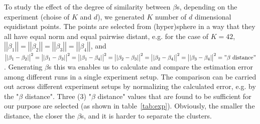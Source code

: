 \documentclass[12pt]{article}
\begin{document}
To study the effect of the degree of similarity between $\beta$s, depending on the experiment (choise of $K$ and $d$), we generated $K$ number of $d$ dimensional equidistant points. The points are selected from (hyper)sphere in a way that they all have equal norm and equal pairwise distant, e.g. for the case of $K=42$, $\left| \left| \beta _{1}\right| \right|= \left| \left|\beta _{2}\right| \right|= \left| \left|\beta _{3}\right| \right| = \left| \left|\beta _{4}\right| \right|$, and $\left| \left| \beta _{1}-\beta _{2}\right| \right| ^{2}= \left| \left| \beta _{1}-\beta _{3}\right| \right| ^{2} = \left| \left| \beta _{1}-\beta _{4}\right| \right| ^{2} = \left| \left| \beta _{2}-\beta _{3}\right| \right| ^{2} = \left| \left| \beta _{2}-\beta _{4}\right| \right| ^{2} = \left| \left| \beta _{3}-\beta _{4}\right| \right| ^{2}= "\beta \text{ distance}"$. Generating $\beta$s this wa enables us to calculate and compare the estimation error among different runs in a single experiment setup. The comparison can be carried out across different experiment setups by normalizing the calculated error, e.g. by the "$\beta$ distance".
Three (3) "$\beta$ distance" values that are found to be sufficient for our purpose are selected (as shown in table~\ref{tab:exp}). Obviously, the smaller the distance, the closer the $\beta$s, and it is harder to separate the clusters.
\end{document}
